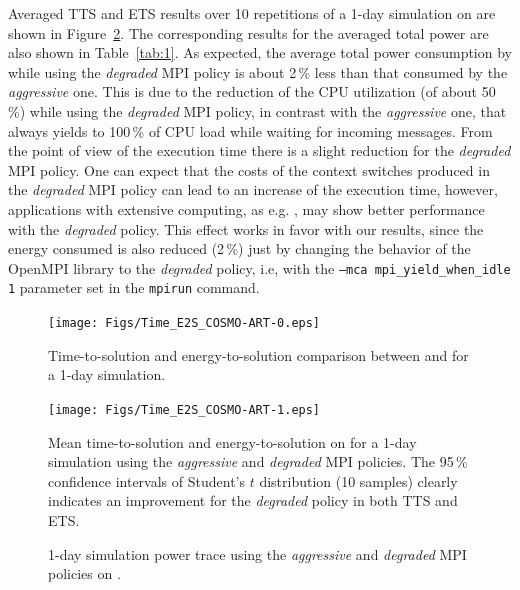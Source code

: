 Averaged TTS and ETS results  over 10 repetitions of a 1-day simulation on
\tinto are shown in  Figure~\ref{fig:4}. The corresponding results for
the  averaged total  power are  also shown  in  Table~\ref{tab:1}.  As
expected, the average total power consumption by \cosmoart while using
the \emph{degraded} MPI policy is about  2\,\% less than that consumed by the
\emph{aggressive} one. This is  due to  the reduction of the CPU utilization (of about 50\,\%) while using  the \emph{degraded} MPI policy, in
contrast with the \emph{aggressive} one, that always yields to 100\,\% of CPU load while waiting for incoming messages. From the point of  view of the execution time there is a
slight reduction  for the \emph{degraded} MPI  policy. One can  expect that the
costs of the context switches produced in the \emph{degraded} MPI policy can lead to
an  increase  of  the   execution  time,  however,  applications  with
extensive computing,  as e.g.  \cosmoart, may show  better performance
with the \emph{degraded} policy. This effect works in  favor with our results,
since the energy consumed is also reduced (2\,\%) just by changing the
behavior of the OpenMPI library  to the \emph{degraded} policy, i.e, with the
\texttt{--mca    mpi\_yield\_when\_idle 1}   parameter   set    in   the
\texttt{mpirun} command.

\begin{figure}[ht]
  \centering
  \texttt{[image: Figs/Time\_E2S\_COSMO-ART-0.eps]}
  \caption{Time-to-solution and  energy-to-solution comparison between
    \pilat and \monch for a 1-day simulation.}
  \label{fig:3}
\end{figure}

\begin{figure}[ht]
  \centering
  \texttt{[image: Figs/Time\_E2S\_COSMO-ART-1.eps]}
  \vspace{-1cm}
  \caption{Mean time-to-solution and  energy-to-solution on \tinto for
    a 1-day simulation using the  \emph{aggressive} and \emph{degraded} MPI policies. The
    95\,\%  confidence  intervals of  Student's  $t$ distribution  (10
    samples) clearly  indicates an improvement for the \emph{degraded} policy in
    both TTS and ETS.}
  \label{fig:4}
\end{figure}

\begin{figure}[ht]
  \centering
  \hspace{0.8cm} \scalebox{0.62}{}
  \caption{1-day simulation power  trace  using  the \emph{aggressive}  and
    \emph{degraded} MPI policies on \tinto.}
  \label{fig:5}
\end{figure}

